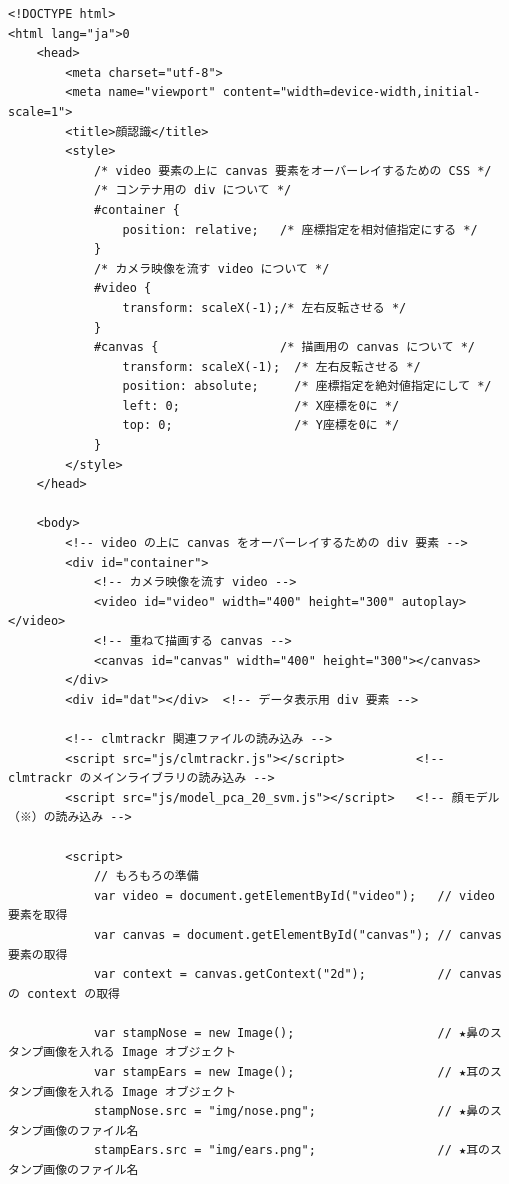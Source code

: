 \documentclass[mingoth,11pt,a4j,uplatex]{jsarticle}
\begin{document}
\begin{lstlisting}[caption=07-04.html]
<!DOCTYPE html>
<html lang="ja">0
    <head>
        <meta charset="utf-8">
        <meta name="viewport" content="width=device-width,initial-scale=1">
        <title>顔認識</title>
        <style>
            /* video 要素の上に canvas 要素をオーバーレイするための CSS */
            /* コンテナ用の div について */
            #container {              
                position: relative;   /* 座標指定を相対値指定にする */
            }
            /* カメラ映像を流す video について */
            #video {                  
                transform: scaleX(-1);/* 左右反転させる */
            }
            #canvas {                 /* 描画用の canvas について */
                transform: scaleX(-1);  /* 左右反転させる */
                position: absolute;     /* 座標指定を絶対値指定にして */
                left: 0;                /* X座標を0に */
                top: 0;                 /* Y座標を0に */
            }
        </style>
    </head>

    <body>
        <!-- video の上に canvas をオーバーレイするための div 要素 -->
        <div id="container">  
            <!-- カメラ映像を流す video -->
            <video id="video" width="400" height="300" autoplay></video>
            <!-- 重ねて描画する canvas -->
            <canvas id="canvas" width="400" height="300"></canvas>        
        </div>
        <div id="dat"></div>  <!-- データ表示用 div 要素 -->
        
        <!-- clmtrackr 関連ファイルの読み込み -->
        <script src="js/clmtrackr.js"></script>          <!-- clmtrackr のメインライブラリの読み込み -->
        <script src="js/model_pca_20_svm.js"></script>   <!-- 顔モデル（※）の読み込み -->
        
        <script>
            // もろもろの準備
            var video = document.getElementById("video");   // video 要素を取得
            var canvas = document.getElementById("canvas"); // canvas 要素の取得
            var context = canvas.getContext("2d");          // canvas の context の取得
            
            var stampNose = new Image();                    // ★鼻のスタンプ画像を入れる Image オブジェクト
            var stampEars = new Image();                    // ★耳のスタンプ画像を入れる Image オブジェクト
            stampNose.src = "img/nose.png";                 // ★鼻のスタンプ画像のファイル名
            stampEars.src = "img/ears.png";                 // ★耳のスタンプ画像のファイル名
            

\end{lstlisting}
\end{document}

